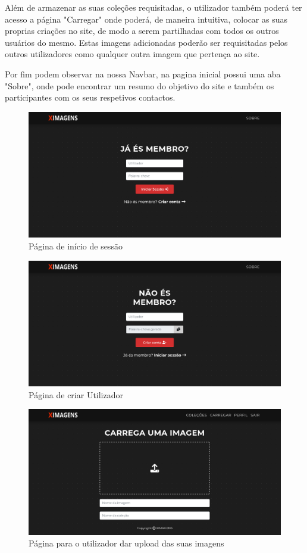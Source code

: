 \documentclass{report}
\begin{document}
Além de armazenar as suas coleções requisitadas, o utilizador também poderá ter acesso a página "Carregar" onde poderá, de maneira intuitiva, colocar as suas proprias criações no site, de modo a serem partilhadas com todos os outros usuários do mesmo. Estas imagens adicionadas poderão ser requisitadas pelos outros utilizadores como qualquer outra imagem que pertença ao site.

Por fim podem observar na nossa Navbar, na pagina inicial possui uma aba "Sobre", onde pode encontrar um resumo do objetivo do site e também os participantes com os seus respetivos contactos. 
\begin{figure}[H]
    \centering
    \includegraphics[width=\textwidth]{unknoawn.png}
    \caption{Página de início de sessão}
\end{figure}
\begin{figure}[H]
    \centering
    \includegraphics[width=\textwidth]{newuser.png}
    \caption{Página de criar Utilizador}
\end{figure}

\begin{figure}[H]
    \centering
    \includegraphics[width=\textwidth]{upload.png}
    \caption{Página para o utilizador dar upload das suas imagens}
\end{figure}
\end{document}
